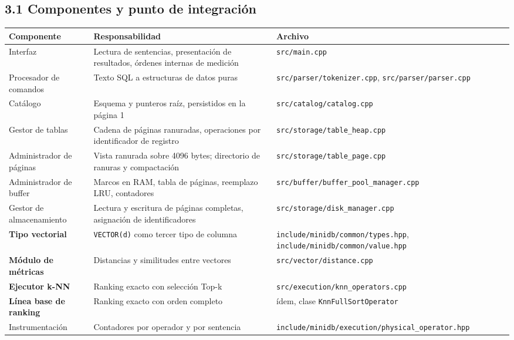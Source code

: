 \documentclass[11pt,a4paper]{article}
\let\pandocsubsection\subsection
\let\subsection\section
\let\subsubsection\pandocsubsection
\begin{document}
\subsubsection{3.1 Componentes y punto de
integración}\label{31-componentes-y-punto-de-integraciuxf3n}

\begin{longtable}[]{@{}L{0.17\textwidth}L{0.41\textwidth}L{0.35\textwidth}@{}}
\toprule\noalign{}
Componente & Responsabilidad & Archivo \\
\midrule\noalign{}
\endhead
\bottomrule\noalign{}
\endlastfoot
Interfaz & Lectura de sentencias, presentación de resultados, órdenes
internas de medición & \texttt{src/main.cpp} \\
Procesador de comandos & Texto SQL a estructuras de datos puras &
\texttt{src/parser/tokenizer.cpp}, \texttt{src/parser/parser.cpp} \\
Catálogo & Esquema y punteros raíz, persistidos en la página 1 &
\texttt{src/catalog/catalog.cpp} \\
Gestor de tablas & Cadena de páginas ranuradas, operaciones por
identificador de registro & \texttt{src/storage/table\_heap.cpp} \\
Administrador de páginas & Vista ranurada sobre 4096 bytes; directorio
de ranuras y compactación & \texttt{src/storage/table\_page.cpp} \\
Administrador de buffer & Marcos en RAM, tabla de páginas, reemplazo
LRU, contadores & \texttt{src/buffer/buffer\_pool\_manager.cpp} \\
Gestor de almacenamiento & Lectura y escritura de páginas completas,
asignación de identificadores &
\texttt{src/storage/disk\_manager.cpp} \\
\textbf{Tipo vectorial} & \texttt{VECTOR(d)} como tercer tipo de columna
& \texttt{include/minidb/common/types.hpp},
\texttt{include/minidb/common/value.hpp} \\
\textbf{Módulo de métricas} & Distancias y similitudes entre vectores &
\texttt{src/vector/distance.cpp} \\
\textbf{Ejecutor k-NN} & Ranking exacto con selección Top-k &
\texttt{src/execution/knn\_operators.cpp} \\
\textbf{Línea base de ranking} & Ranking exacto con orden completo &
ídem, clase \texttt{KnnFullSortOperator} \\
Instrumentación & Contadores por operador y por sentencia &
\texttt{include/minidb/execution/physical\_operator.hpp} \\
\end{longtable}
\end{document}

